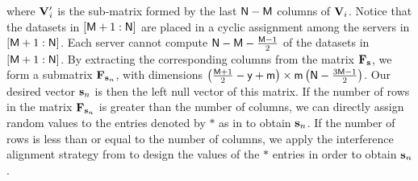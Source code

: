 \documentclass[conference,letterpaper]{IEEEtran}
\begin{document}
where ${\bf V}'_i$ is the sub-matrix formed by the last ${\sf N} - {\sf M}$ columns of ${\bf V}_i$.
Notice that the datasets in $[{\sf M}+1 : {\sf N}]$ are placed in a cyclic assignment among the servers in $[{\sf M}+1 : {\sf N}]$. Each server cannot compute ${\sf N} - {\sf M} - \frac{{\sf M} - 1}{2}$ of the datasets in $[{\sf M}+1 : {\sf N}]$. By extracting the corresponding columns from the matrix ${\bf F}_{\bf s}$, we form a submatrix ${\bf F}_{{\bf s}_n}$, with dimensions 
$\left(\frac{{\sf M} + 1}{2} - {\sf y} + {\sf m}\right) \times {\sf m} \left({\sf N} - \frac{3{\sf M} - 1}{2}\right)$.
Our desired vector ${\bf s}_n$ is then the left null vector of this matrix.
If the number of rows in the matrix ${\bf F}_{{\bf s}_n}$ is greater than the number of columns, we can directly assign random values to the entries denoted by $*$ as in \cite{wan2022secure} to obtain ${\bf s}_n$. If the number of rows is less than or equal to the number of columns, we apply the interference alignment strategy from \cite{huang2023ISITversion} to design the values of the $*$ entries in order to obtain ${\bf s}_n$.
\end{document}
